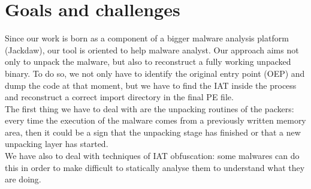 \section{Goals and challenges}
Since our work is born as a component of a bigger malware analysis platform (Jackdaw), our tool is oriented to help malware analyst. 
Our approach aims not only to unpack the malware, but also to reconstruct a fully working unpacked binary. To do so, we not only have to identify the original entry point (OEP) and dump the code at that moment, but we have to find the IAT inside the process and reconstruct a correct import directory in the final PE file.\\
The first thing we have to deal with are the unpacking routines of the packers: every time the execution of the malware comes from a previously written memory area, then it could be a sign that the unpacking stage has finished or that a new unpacking layer has started.\\
We have also to deal with techniques of IAT obfuscation: some malwares can do this in order to make difficult to statically analyse them to understand what they are doing.

